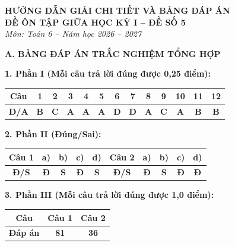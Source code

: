 \documentclass[12pt,a4paper]{article}
\begin{document}
\begin{center}
  \textbf{\Large HƯỚNG DẪN GIẢI CHI TIẾT VÀ BẢNG ĐÁP ÁN}\\
  \textbf{\large ĐỀ ÔN TẬP GIỮA HỌC KỲ I -- ĐỀ SỐ 5}\\
  \textit{Môn: Toán 6 -- Năm học 2026 -- 2027}
\end{center}
\vspace{2mm}

\noindent\textbf{\large A. BẢNG ĐÁP ÁN TRẮC NGHIỆM TỔNG HỢP}
\vspace{1.5mm}

\noindent\textbf{1. Phần I (Mỗi câu trả lời đúng được 0,25 điểm):}
\begin{center}
\begin{tabular}{|c|c|c|c|c|c|c|c|c|c|c|c|c|}
\hline
\textbf{Câu} & \textbf{1} & \textbf{2} & \textbf{3} & \textbf{4} & \textbf{5} & \textbf{6} & \textbf{7} & \textbf{8} & \textbf{9} & \textbf{10} & \textbf{11} & \textbf{12} \\
\hline
\textbf{Đ/A} & \textbf{B} & \textbf{C} & \textbf{A} & \textbf{A} & \textbf{A} & \textbf{D} & \textbf{D} & \textbf{A} & \textbf{C} & \textbf{A} & \textbf{B} & \textbf{B} \\
\hline
\end{tabular}
\end{center}
\vspace{1mm}

\noindent\textbf{2. Phần II (Đúng/Sai):}
\begin{center}
\begin{tabular}{|c|c|c|c|c||c|c|c|c|c|}
\hline
\textbf{Câu 1} & \textbf{a)} & \textbf{b)} & \textbf{c)} & \textbf{d)} & \textbf{Câu 2} & \textbf{a)} & \textbf{b)} & \textbf{c)} & \textbf{d)} \\
\hline
\textbf{Đ/S} & \textbf{Đ} & \textbf{S} & \textbf{Đ} & \textbf{S} & \textbf{Đ/S} & \textbf{Đ} & \textbf{S} & \textbf{Đ} & \textbf{Đ} \\
\hline
\end{tabular}
\end{center}
\vspace{1mm}

\noindent\textbf{3. Phần III (Mỗi câu trả lời đúng được 1,0 điểm):}
\begin{center}
\begin{tabular}{|c|c|c|}
\hline
\textbf{Câu} & \textbf{Câu 1} & \textbf{Câu 2} \\
\hline
\textbf{Đáp án} & \textbf{81} & \textbf{36} \\
\hline
\end{tabular}
\end{center}
\vspace{3mm}
\end{document}
